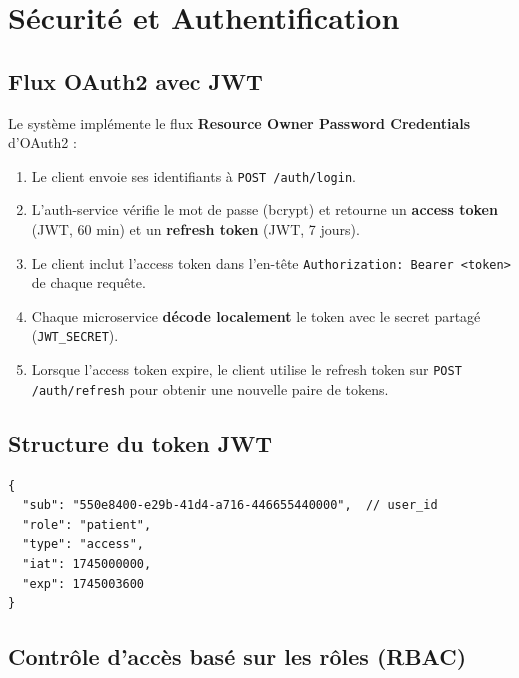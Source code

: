 \documentclass[12pt,a4paper]{article}
\begin{document}
\section{Sécurité et Authentification}

\subsection{Flux OAuth2 avec JWT}

Le système implémente le flux \textbf{Resource Owner Password Credentials} d'OAuth2 :

\begin{enumerate}
  \item Le client envoie ses identifiants à \texttt{POST /auth/login}.
  \item L'auth-service vérifie le mot de passe (bcrypt) et retourne un \textbf{access token} (JWT, 60 min) et un \textbf{refresh token} (JWT, 7 jours).
  \item Le client inclut l'access token dans l'en-tête \texttt{Authorization: Bearer <token>} de chaque requête.
  \item Chaque microservice \textbf{décode localement} le token avec le secret partagé (\texttt{JWT\_SECRET}).
  \item Lorsque l'access token expire, le client utilise le refresh token sur \texttt{POST /auth/refresh} pour obtenir une nouvelle paire de tokens.
\end{enumerate}

\subsection{Structure du token JWT}

\begin{lstlisting}[caption={Payload d'un access token}]
{
  "sub": "550e8400-e29b-41d4-a716-446655440000",  // user_id
  "role": "patient",
  "type": "access",
  "iat": 1745000000,
  "exp": 1745003600
}
\end{lstlisting}

\subsection{Contrôle d'accès basé sur les rôles (RBAC)}
\end{document}
